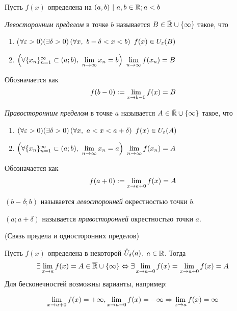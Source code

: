 \begin{definition}
	Пусть $f(x)$ определена на $(a, b)\ |\ a, b \in \mathbb{R}; a < b$
	
	\textit{Левосторонним пределом} в точке $b$ называется $B \in \bar{\mathbb{R}} \cup \{\infty\}$ такое, что
	\begin{enumerate}
		\item ($\forall \varepsilon > 0)(\exists \delta > 0)
		\left(\forall x,\ b - \delta < x < b\right)
		\ f(x) \in U_{\varepsilon}(B)$
		
		\item $\left(\forall \{x_n\}_{n = 1}^\infty \subset
		(a; b),\ \lim\limits_{n \to \infty} x_n = b\right)
	 	\ \lim\limits_{n \to \infty} f(x_n) = B$
	\end{enumerate}
	Обозначается как
	\[
		f(b - 0) := \lim\limits_{x \to b-0} f(x) = B
	\]

	\textit{Правосторонним пределом} в точке $a$ называется $A \in \bar{\mathbb{R}} \cup \{\infty\}$ такое, что
	\begin{enumerate}
		\item $(\forall \varepsilon > 0)(\exists \delta > 0)
		\left(\forall x,\ a < x < a + \delta\right)
		\ f(x) \in U_{\varepsilon}(A)$
		
		\item $\left(\forall \{x_n\}_{n = 1}^\infty \subset (a; b),\ \lim\limits_{n \to \infty} x_n = a\right)\ \lim\limits_{n \to \infty} f(x_n) = A$
	\end{enumerate}
	Обозначается как
	\[
	f(a + 0) := \lim\limits_{x \to a+0} f(x) = A
	\]	
\end{definition}

\begin{definition}
	$(b - \delta; b)$ называется \textit{левосторонней} окрестностью точки $b$.
	
	$(a; a + \delta)$ называется \textit{правосторонней} окрестностью точки $a$.
\end{definition}

\begin{theorem} (Связь предела и односторонних пределов)

	Пусть $f(x)$ определена в некоторой
 	$\mathring{U}_{\delta}(a)$, $a \in \mathbb{R}$. Тогда
	\[
		\exists \lim\limits_{x \to a} f(x) = A \in \overline{\mathbb{R}}
		\cup \left\{\infty\right\} \Leftrightarrow \exists \lim\limits_{x \to a-0}
		f(x) = \lim\limits_{x \to a+0} f(x) = A
	\]
	Для бесконечностей возможны варианты, например:

	\[ 
		\lim\limits_{x \to a + 0} f(x) = +\infty, 
		\lim\limits_{x \to a - 0} f(x) = -\infty \Rightarrow
		\lim\limits_{x \to a} f(x) = \infty
	\]

\end{theorem}

